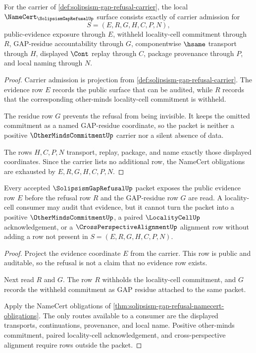 \begin{theorem}
\label{thm:solipsism-gap-refusal-namecert-obligations}
For the carrier of \autoref{def:solipsism-gap-refusal-carrier}, the local $\NameCert_{\SolipsismGapRefusalUp}$ surface consists exactly of carrier admission for
$$
S=(E,R,G,H,C,P,N),
$$
public-evidence exposure through $E$, withheld locality-cell commitment through $R$, GAP-residue accountability through $G$, componentwise $\hsame$ transport through $H$, displayed $\Cont$ replay through $C$, package provenance through $P$, and local naming through $N$.
\end{theorem}
\begin{proof}
Carrier admission is projection from \autoref{def:solipsism-gap-refusal-carrier}. The evidence row $E$ records the public surface that can be audited, while $R$ records that the corresponding other-minds locality-cell commitment is withheld.

The residue row $G$ prevents the refusal from being invisible. It keeps the omitted commitment as a named GAP-residue coordinate, so the packet is neither a positive $\OtherMindsCommitmentUp$ carrier nor a silent absence of data.

The rows $H,C,P,N$ transport, replay, package, and name exactly those displayed coordinates. Since the carrier lists no additional row, the NameCert obligations are exhausted by $E,R,G,H,C,P,N$.
\end{proof}

\begin{theorem}
\label{thm:solipsism-gap-refusal-locality-cell-refusal}
Every accepted $\SolipsismGapRefusalUp$ packet exposes the public evidence row $E$ before the refusal row $R$ and the GAP-residue row $G$ are read. A locality-cell consumer may audit that evidence, but it cannot turn the packet into a positive $\OtherMindsCommitmentUp$, a paired $\LocalityCellUp$ acknowledgement, or a $\CrossPerspectiveAlignmentUp$ alignment row without adding a row not present in $S=(E,R,G,H,C,P,N)$.
\end{theorem}
\begin{proof}
Project the evidence coordinate $E$ from the carrier. This row is public and auditable, so the refusal is not a claim that no evidence row exists.

Next read $R$ and $G$. The row $R$ withholds the locality-cell commitment, and $G$ records the withheld commitment as GAP residue attached to the same packet.

Apply the NameCert obligations of \autoref{thm:solipsism-gap-refusal-namecert-obligations}. The only routes available to a consumer are the displayed transports, continuations, provenance, and local name. Positive other-minds commitment, paired locality-cell acknowledgement, and cross-perspective alignment require rows outside the packet.
\end{proof}

